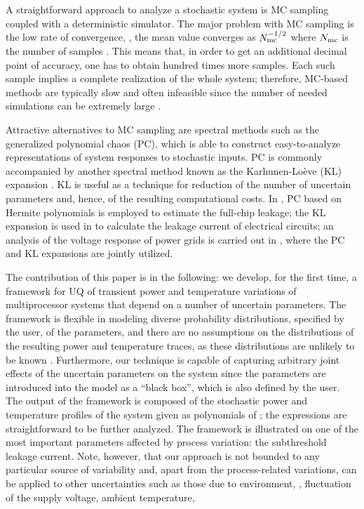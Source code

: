 
A straightforward approach to analyze a stochastic system is MC sampling coupled with a deterministic simulator. The major problem with MC sampling is the low rate of convergence, \eg, the mean value converges as $N_\text{mc}^{-{{1}/{2}}}$ where $N_\text{mc}$ is the number of samples \cite{xiu2010, maitre2010}. This means that, in order to get an additional decimal point of accuracy, one has to obtain hundred times more samples. Each such sample implies a complete realization of the whole system; therefore, MC-based methods are typically slow and often infeasible since the number of needed simulations can be extremely large \cite{diaz-emparanza2002}.

Attractive alternatives to MC sampling are spectral methods \cite{xiu2010, maitre2010} such as the generalized polynomial chaos (PC), which is able to construct easy-to-analyze representations of system responses to stochastic inputs. PC is commonly accompanied by another spectral method known as the Karhunen-Lo\`{e}ve (KL) expansion \cite{ghanem1991}. KL is useful as a technique for reduction of the number of uncertain parameters and, hence, of the resulting computational costs. In \cite{shen2009}, PC based on Hermite polynomials is employed to estimate the full-chip leakage; the KL expansion is used in \cite{bhardwaj2006} to calculate the leakage current of electrical circuits; an analysis of the voltage response of power grids is carried out in \cite{ghanta2006}, where the PC and KL expansions are jointly utilized.

The contribution of this paper is in the following: we develop, for the first time, a framework for UQ of transient power and temperature variations of multiprocessor systems that depend on a number of uncertain parameters. The framework is flexible in modeling diverse probability distributions, specified by the user, of the parameters, and there are no assumptions on the distributions of the resulting power and temperature traces, as these distributions are unlikely to be known \apriori. Furthermore, our technique is capable of capturing arbitrary joint effects of the uncertain parameters on the system since the parameters are introduced into the model as a ``black box'', which is also defined by the user. The output of the framework is composed of the stochastic power and temperature profiles of the system given as polynomials of \rvs; the expressions are straightforward to be further analyzed. The framework is illustrated on one of the most important parameters affected by process variation: the subthreshold leakage current. Note, however, that our approach is not bounded to any particular source of variability and, apart from the process-related variations, can be applied to other uncertainties such as those due to environment, \ie, fluctuation of the supply voltage, ambient temperature, \etc

